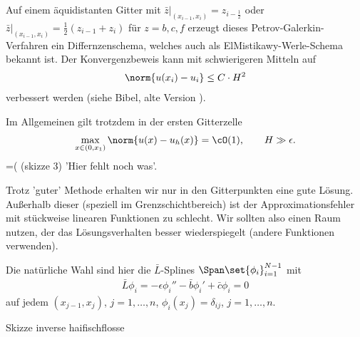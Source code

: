 \begin{bemerkung*}
  Auf einem äquidistanten Gitter mit $\bar z|_{(x_{i-1}, x_{i})} = z_{i - \frac 12}$ oder $\bar z|_{(x_{i-1}, x_{i})} = \frac 12 (z_{i-1} + z_{i})$ für $z = b, c, f$ erzeugt dieses Petrov-Galerkin-Verfahren ein Differnzenschema, welches auch als ElMistikawy-Werle-Schema bekannt ist. Der Konvergenzbeweis kann mit schwierigeren Mitteln auf
  \begin{align*}
    \norm{u(x_{i}) - u_{i}} \leq C\cdot H^{2}
  \end{align*}
verbessert werden (siehe Bibel, alte Version ).
\end{bemerkung*}
Im Allgemeinen gilt trotzdem in der ersten Gitterzelle
\begin{align*}
  \max_{x \in (0, x_{1})} \norm{u(x) - u_{h}(x)} = \cO(1), \qquad H \gg\epsilon. 
\end{align*}
=( (skizze 3) 'Hier fehlt noch was'. 

Trotz 'guter' Methode erhalten wir nur in den Gitterpunkten eine gute Lösung. Außerhalb dieser (speziell im Grenzschichtbereich) ist der Approximationsfehler mit stückweise linearen Funktionen zu schlecht. Wir sollten also einen Raum nutzen, der das Lösungsverhalten besser wiederspiegelt (andere Funktionen verwenden). 

Die natürliche Wahl sind hier die $\bar L$-Splines $\Span \set{\phi_{i}}_{i = 1}^{N-1}$ mit
\begin{align*}
  \bar L \phi_{i} = - \epsilon \phi_{i}''  - \bar b \phi_{i}' + \bar c \phi_{i} = 0
\end{align*}
auf jedem $(x_{j-1}, x_{j})$, $j = 1, \dots, n$, $\phi_{i}(x_{j}) = \delta_{ij}$, $j = 1, \dots, n$. 

Skizze inverse haifischflosse


